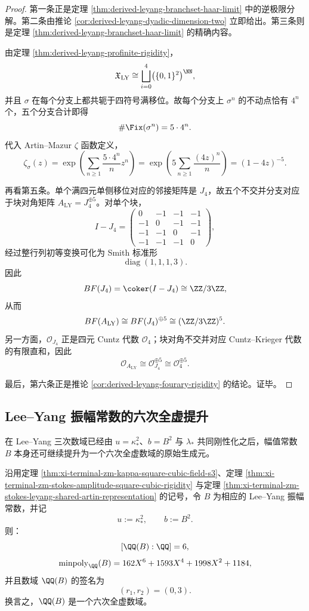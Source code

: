 \begin{proof}
第一条正是定理 \ref{thm:derived-leyang-branchset-haar-limit} 中的逆极限分解。第二条由推论 \ref{cor:derived-leyang-dyadic-dimension-two} 立即给出。第三条则是定理 \ref{thm:derived-leyang-branchset-haar-limit} 的精确内容。

由定理 \ref{thm:derived-leyang-profinite-rigidity}，
\[
\mathfrak X_{\mathrm{LY}}
\cong
\bigsqcup_{i=0}^{4}\bigl(\{0,1\}^{2}\bigr)^{\NN},
\]
并且 \(\sigma\) 在每个分支上都共轭于四符号满移位。故每个分支上 \(\sigma^n\) 的不动点恰有 \(4^n\) 个，五个分支合计即得
\[
\#\Fix(\sigma^n)=5\cdot 4^n.
\]
代入 Artin--Mazur \(\zeta\) 函数定义，
\[
\zeta_\sigma(z)
=
\exp\!\left(
\sum_{n\ge 1}\frac{5\cdot 4^n}{n}z^n
\right)
=
\exp\!\left(
5\sum_{n\ge 1}\frac{(4z)^n}{n}
\right)
=
(1-4z)^{-5}.
\]

再看第五条。单个满四元单侧移位对应的邻接矩阵是 \(J_4\)，故五个不交并分支对应于块对角矩阵 \(A_{\mathrm{LY}}=J_4^{\oplus 5}\)。对单个块，
\[
I-J_4
=
\begin{pmatrix}
0&-1&-1&-1\\
-1&0&-1&-1\\
-1&-1&0&-1\\
-1&-1&-1&0
\end{pmatrix},
\]
经过整行列初等变换可化为 Smith 标准形
\[
\operatorname{diag}(1,1,1,3).
\]
因此
\[
BF(J_4)=\coker(I-J_4)\cong \ZZ/3\ZZ,
\]
从而
\[
BF(A_{\mathrm{LY}})
\cong
BF(J_4)^{\oplus 5}
\cong
(\ZZ/3\ZZ)^5.
\]
另一方面，\(\mathcal O_{J_4}\) 正是四元 Cuntz 代数 \(\mathcal O_4\)；块对角不交并对应 Cuntz--Krieger 代数的有限直和，因此
\[
\mathcal O_{A_{\mathrm{LY}}}
\cong
\mathcal O_{J_4}^{\oplus 5}
\cong
\mathcal O_4^{\oplus 5}.
\]

最后，第六条正是推论 \ref{cor:derived-leyang-fourary-rigidity} 的结论。证毕。
\end{proof}

\subsection{Lee--Yang 振幅常数的六次全虚提升}

在 Lee--Yang 三次数域已经由 \(u=\kappa_*^2\)、\(b=B^2\) 与 \(\lambda_*\) 共同刚性化之后，幅值常数 \(B\) 本身还可继续提升为一个六次全虚数域的原始生成元。

\begin{theorem}\label{thm:derived-leyang-amplitude-degree-signature}
沿用定理 \ref{thm:xi-terminal-zm-kappa-square-cubic-field-s3}、定理 \ref{thm:xi-terminal-zm-stokes-amplitude-square-cubic-rigidity} 与定理 \ref{thm:xi-terminal-zm-stokes-leyang-shared-artin-representation} 的记号，令 \(B\) 为相应的 Lee--Yang 振幅常数，并记
\[
u:=\kappa_*^2,
\qquad
b:=B^2.
\]
则：
\[
[\QQ(B):\QQ]=6,
\]
\[
\operatorname{minpoly}_{\QQ}(B)
=
162X^6+1593X^4+1998X^2+1184,
\]
并且数域 \(\QQ(B)\) 的签名为
\[
(r_1,r_2)=(0,3).
\]
换言之，\(\QQ(B)\) 是一个六次全虚数域。
\end{theorem}

